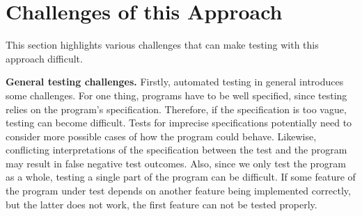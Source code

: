 
\section{Challenges of this Approach}
\label{sec:appraoch_challenges}


This section highlights various challenges that can make testing with this approach difficult.
\parspace

\textbf{General testing challenges.}
Firstly, automated testing in general introduces some challenges.
For one thing, programs have to be well specified, since testing relies on the program's specification.
Therefore, if the specification is too vague, testing can become difficult.
Tests for imprecise specifications potentially need to consider more possible cases of how the program could behave.
Likewise, conflicting interpretations of the specification between the test and the program may result in false negative test outcomes.
Also, since we only test the program as a whole, testing a single part of the program can be difficult.
If some feature of the program under test depends on another feature being implemented correctly,
but the latter does not work, the first feature can not be tested properly.
\parspace

